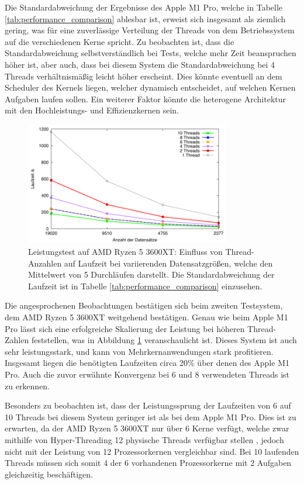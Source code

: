 Die Standardabweichung der Ergebnisse des Apple M1 Pro, welche in Tabelle \ref{tab:performance_comparison} ablesbar ist, erweist sich insgesamt als ziemlich gering, was für eine zuverlässige Verteilung der Threads von dem Betriebssystem  auf die verschiedenen Kerne spricht. Zu beobachten ist, dass die Standardabweichung selbstverständlich bei Tests, welche mehr Zeit beanspruchen höher ist, aber auch, dass bei diesem System die Standardabweichung bei 4 Threads verhältnismäßig leicht höher erscheint. Dies könnte eventuell an dem Scheduler des Kernels liegen, welcher dynamisch entscheidet, auf welchen Kernen Aufgaben laufen sollen. Ein weiterer Faktor könnte die heterogene Architektur mit den Hochleistungs- und Effizienzkernen sein.

\begin{figure}[H]
\centering
\includegraphics[width=0.8\textwidth]{../results/plots/3600xt/comp_all_threads.pdf}
\caption{Leistungstest auf AMD Ryzen 5 3600XT: Einfluss von Thread-Anzahlen auf Laufzeit bei variierenden Datensatzgrößen, welche den Mittelwert von 5 Durchläufen darstellt. Die Standardabweichung der Laufzeit ist in Tabelle \ref{tab:performance_comparison} einzusehen.}
\label{fig:ryzen_benchmark_threads}
\end{figure}

Die angesprochenen Beobachtungen bestätigen sich beim zweiten Testsystem, dem AMD Ryzen 5 3600XT weitgehend bestätigen. Genau wie beim Apple M1 Pro lässt sich eine erfolgreiche Skalierung der Leistung bei höheren Thread-Zahlen feststellen, was in Abbildung \ref{fig:ryzen_benchmark_threads} veranschaulicht ist. Dieses System ist auch sehr leistungsstark, und kann von Mehrkernanwendungen stark profitieren. Insgesamt liegen die benötigten Laufzeiten circa 20\% über denen des Apple M1 Pro. Auch die zuvor erwähnte Konvergenz bei 6 und 8 verwendeten Threads ist zu erkennen. 

Besonders zu beobachten ist, dass der Leistungssprung der Laufzeiten von 6 auf 10 Threads bei diesem System geringer ist als bei dem Apple M1 Pro. Dies ist zu erwarten, da der AMD Ryzen 5 3600XT nur über 6 Kerne verfügt, welche zwar mithilfe von Hyper-Threading 12 physische Threads verfügbar stellen \citep{Ryzen_Technische_Daten}, jedoch nicht mit der Leistung von 12 Prozessorkernen vergleichbar sind. Bei 10 laufenden Threads müssen sich somit 4 der 6 vorhandenen Prozessorkerne mit 2 Aufgaben gleichzeitig beschäftigen.

